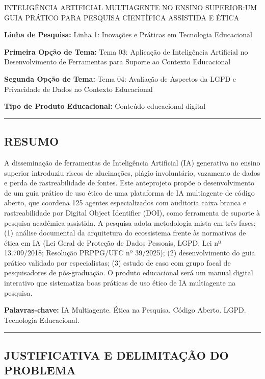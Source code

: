 \documentclass[
  brazilian,
  12pt,
]{article}
\author{}
\date{}
\begin{document}
INTELIGÊNCIA ARTIFICIAL MULTIAGENTE NO ENSINO SUPERIOR:UM GUIA PRÁTICO
PARA PESQUISA CIENTÍFICA ASSISTIDA E ÉTICA

\textbf{Linha de Pesquisa:} Linha 1: Inovações e Práticas em Tecnologia
Educacional

\textbf{Primeira Opção de Tema:} Tema 03: Aplicação de Inteligência
Artificial no Desenvolvimento de Ferramentas para Suporte ao Contexto
Educacional

\textbf{Segunda Opção de Tema:} Tema 04: Avaliação de Aspectos da LGPD e
Privacidade de Dados no Contexto Educacional

\textbf{Tipo de Produto Educacional:} Conteúdo educacional digital

\begin{center}\rule{0.5\linewidth}{0.5pt}\end{center}

\subsection{RESUMO}\label{resumo}

A disseminação de ferramentas de Inteligência Artificial (IA) generativa
no ensino superior introduziu riscos de alucinações, plágio
involuntário, vazamento de dados e perda de rastreabilidade de fontes.
Este anteprojeto propõe o desenvolvimento de um guia prático de uso
ético de uma plataforma de IA multiagente de código aberto, que coordena
125 agentes especializados com auditoria caixa branca e rastreabilidade
por Digital Object Identifier (DOI), como ferramenta de suporte à
pesquisa acadêmica assistida. A pesquisa adota metodologia mista em três
fases: (1) análise documental da arquitetura do ecossistema frente às
normativas de ética em IA (Lei Geral de Proteção de Dados Pessoais,
LGPD, Lei nº 13.709/2018; Resolução PRPPG/UFC nº 39/2025); (2)
desenvolvimento do guia prático validado por especialistas; (3) estudo
de caso com grupo focal de pesquisadores de pós-graduação. O produto
educacional será um manual digital interativo que sistematiza boas
práticas de uso ético de IA multiagente na pesquisa.

\textbf{Palavras-chave:} IA Multiagente. Ética na Pesquisa. Código
Aberto. LGPD. Tecnologia Educacional.

\begin{center}\rule{0.5\linewidth}{0.5pt}\end{center}

\subsection{JUSTIFICATIVA E DELIMITAÇÃO DO
PROBLEMA}\label{justificativa-e-delimitauxe7uxe3o-do-problema}
\end{document}
